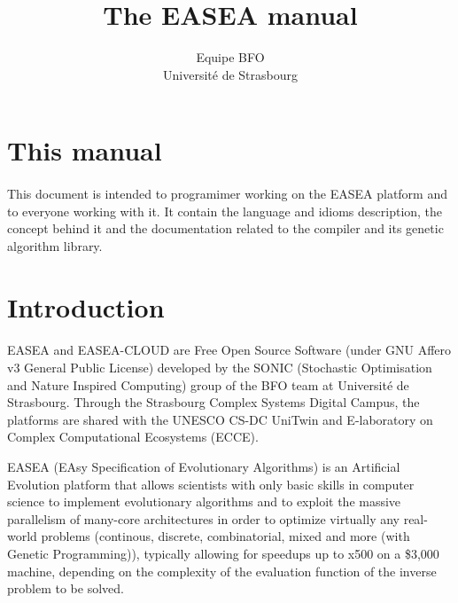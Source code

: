 \documentclass{article}
\begin{document}
\title{The EASEA manual}
\author{Equipe BFO \\
  \small Université de Strasbourg}
\maketitle


\section{This manual} %
\label{sec:introduction}
  \paragraph{} %
  \label{par:}

  This document is intended to programimer working on the EASEA platform and to
  everyone working with it. It contain the language and idioms description, the
  concept behind it and the documentation related to the compiler and its genetic
  algorithm library.

\section{Introduction} %
\label{sec:Introduction}
\paragraph{} %
\label{par:}

EASEA and EASEA-CLOUD are Free Open Source Software (under GNU Affero v3 General Public License) developed by the SONIC (Stochastic Optimisation and Nature Inspired Computing) group of the BFO team at Université de Strasbourg. Through the Strasbourg Complex Systems Digital Campus, the platforms are shared with the UNESCO CS-DC UniTwin and E-laboratory on Complex Computational Ecosystems (ECCE).

EASEA (EAsy Specification of Evolutionary Algorithms) is an Artificial Evolution
platform that allows scientists with only basic skills in computer science to
implement evolutionary algorithms and to exploit the massive parallelism of
many-core architectures in order to optimize virtually any real-world problems
(continous, discrete, combinatorial, mixed and more (with Genetic Programming)),
typically allowing for speedups up to x500 on a \$3,000 machine, depending on the complexity of the evaluation function of the inverse problem to be solved.
\end{document}
